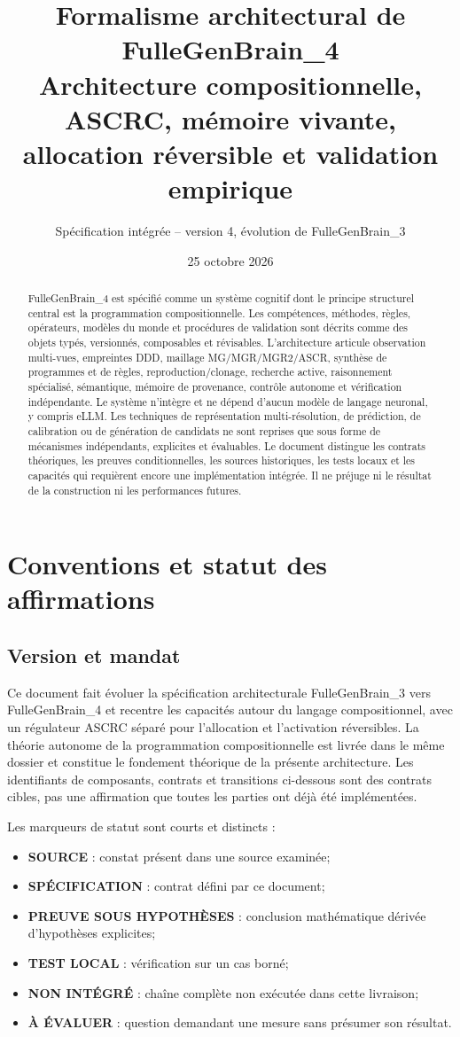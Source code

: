 \documentclass[11pt,a4paper]{article}
\title{Formalisme architectural de FulleGenBrain\_4\\
\large Architecture compositionnelle, ASCRC, mémoire vivante, allocation réversible et validation empirique}
\author{Spécification intégrée -- version 4, évolution de FulleGenBrain\_3}
\date{25 octobre 2026}
\newcommand{\Role}[1]{\textbf{#1}}
\begin{document}
\maketitle
\begin{abstract}
FulleGenBrain\_4 est spécifié comme un système cognitif dont le principe structurel central est la programmation compositionnelle. Les compétences, méthodes, règles, opérateurs, modèles du monde et procédures de validation sont décrits comme des objets typés, versionnés, composables et révisables. L'architecture articule observation multi-vues, empreintes DDD, maillage MG/MGR/MGR2/ASCR, synthèse de programmes et de règles, reproduction/clonage, recherche active, raisonnement spécialisé, sémantique, mémoire de provenance, contrôle autonome et vérification indépendante. Le système n'intègre et ne dépend d'aucun modèle de langage neuronal, y compris eLLM. Les techniques de représentation multi-résolution, de prédiction, de calibration ou de génération de candidats ne sont reprises que sous forme de mécanismes indépendants, explicites et évaluables. Le document distingue les contrats théoriques, les preuves conditionnelles, les sources historiques, les tests locaux et les capacités qui requièrent encore une implémentation intégrée. Il ne préjuge ni le résultat de la construction ni les performances futures.
\end{abstract}
\newpage\setcounter{tocdepth}{1}\tableofcontents\newpage

\section{Conventions et statut des affirmations}
\subsection{Version et mandat}
Ce document fait évoluer la spécification architecturale FulleGenBrain\_3 vers FulleGenBrain\_4 et recentre les capacités autour du langage compositionnel, avec un régulateur ASCRC séparé pour l'allocation et l'activation réversibles. La théorie autonome de la programmation compositionnelle est livrée dans le même dossier et constitue le fondement théorique de la présente architecture. Les identifiants de composants, contrats et transitions ci-dessous sont des contrats cibles, pas une affirmation que toutes les parties ont déjà été implémentées.

Les marqueurs de statut sont courts et distincts :
\begin{itemize}
\item \Role{SOURCE} : constat présent dans une source examinée;
\item \Role{SPÉCIFICATION} : contrat défini par ce document;
\item \Role{PREUVE SOUS HYPOTHÈSES} : conclusion mathématique dérivée d'hypothèses explicites;
\item \Role{TEST LOCAL} : vérification sur un cas borné;
\item \Role{NON INTÉGRÉ} : chaîne complète non exécutée dans cette livraison;
\item \Role{À ÉVALUER} : question demandant une mesure sans présumer son résultat.
\end{itemize}
\end{document}
